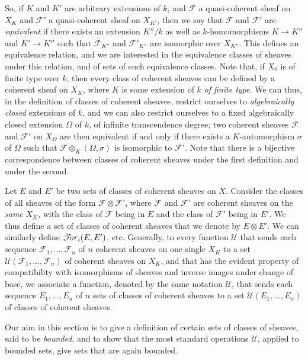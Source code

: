   So, if \(K\) and \(K'\) are arbitrary extensions of \(k\), and \(\mathscr {F}\) a quasi-coherent sheaf on \(X_K\) and \(\mathscr {F}'\) a quasi-coherent sheaf on \(X_{K'}\), then we say that \(\mathscr {F}\) and \(\mathscr {F}'\) are \emph{equivalent} if there exists an extension \(K''/k\) as well as \(k\)-homomorphisms \(K\to  K''\) and \(K'\to  K''\) such that \(\mathscr {F}_{K''}\) and \(\mathscr {F}'_{K''}\) are isomorphic over \(X_{K''}\).
  This defines an equivalence relation, and we are interested in the equivalence classes of sheaves under this relation, and of sets of such equivalence classes.
  Note that, if \(X_0\) is of finite type over \(k\), then every class of coherent sheaves can be defined by a coherent sheaf on \(X_K\), where \(K\) is some extension of \(k\) \emph{of finite type}.
  We can thus, in the definition of classes of coherent sheaves, restrict ourselves to \emph{algebraically closed} extensions of \(k\), and we can also restrict ourselves to a fixed algebraically closed extension \(\Omega \) of \(k\), of infinite transcendence degree;
  two coherent sheaves \(\mathscr {F}\) and \(\mathscr {F}'\) on \(X_\Omega \) are then equivalent if and only if there exists a \(K\)-automorphism \(\sigma \) of \(\Omega \) such that \(\mathscr {F}\otimes _K(\Omega ,\sigma )\) is isomorphic to \(\mathscr {F}'\).
  Note that there is a bijective correspondence between classes of coherent sheaves under the first definition and under the second.\par{}Let \(E\) and \(E'\) be two sets of classes of coherent sheaves on \(X\).
  Consider the classes of all sheaves of the form \(\mathscr {F}\otimes \mathscr {F}'\), where \(\mathscr {F}\) and \(\mathscr {F}'\) are coherent sheaves on the \emph{same} \(X_K\), with the class of \(\mathscr {F}\) being in \(E\) and the class of \(\mathscr {F}'\) being in \(E'\).
  We thus define a set of classes of coherent sheaves that we denote by \(E\otimes  E'\).
  We can similarly define \(\mathscr {T}\kern  -2.75pt\mathit {or}_i(E,E')\), etc.
  Generally, to every function \(\mathscr {U}\) that sends each sequence \(\mathscr {F}_1,\ldots ,\mathscr {F}_n\) of \(n\) coherent sheaves on one single \(X_K\) to a set \(\mathscr {U}(\mathscr {F}_1,\ldots ,\mathscr {F}_n)\) of coherent sheaves on \(X_K\), and that has the evident property of compatibility with isomorphisms of sheaves and inverse images under change of base, we associate a function, denoted by the same notation \(\mathscr {U}\), that sends each sequence \(E_1,\ldots ,E_n\) of \(n\) sets of classes of coherent sheaves to a set \(\mathscr {U}(E_1,\ldots ,E_n)\) of classes of coherent sheaves.\par{}Our aim in this section is to give a definition of certain sets of classes of sheaves, said to be \emph{bounded}, and to show that the most standard operations \(\mathscr {U}\), applied to bounded sets, give sets that are again bounded.

